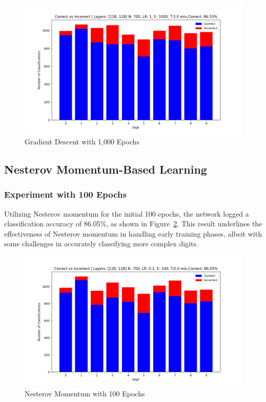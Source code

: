\documentclass{article}
\begin{document}
\begin{figure}[h!]
    \centering
    \includegraphics[scale=0.5]{../figs/gd_1000ep.png}
    \caption{Gradient Descent with 1,000 Epochs}
    \label{fig:gd_1000ep}
\end{figure}

\subsection{Nesterov Momentum-Based Learning}

\subsubsection{Experiment with 100 Epochs}
Utilizing Nesterov momentum for the initial 100 epochs, the network logged a classification accuracy of 86.05\%, as shown in Figure~\ref{fig:Nes_100ep}. This result underlines the effectiveness of Nesterov momentum in handling early training phases, albeit with some challenges in accurately classifying more complex digits.

\begin{figure}[h!]
    \centering
    \includegraphics[scale=0.5]{../figs/Nes_100ep.png}
    \caption{Nesterov Momentum with 100 Epochs}
    \label{fig:Nes_100ep}
\end{figure}
\end{document}
